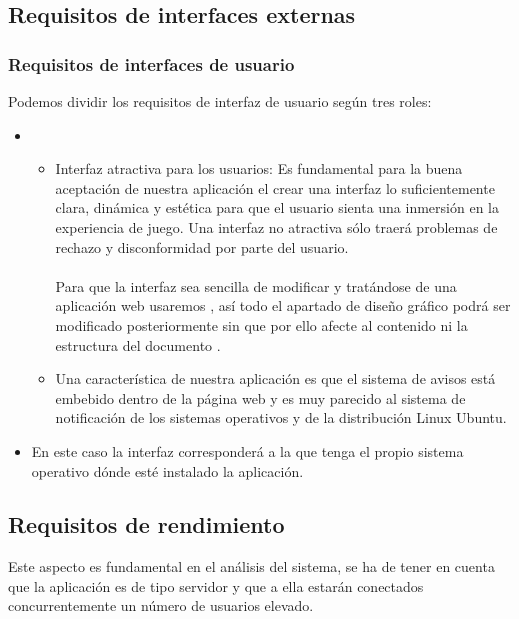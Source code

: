 \subsection{Requisitos de interfaces externas}
\subsubsection{Requisitos de interfaces de usuario}
Podemos dividir los requisitos de interfaz de usuario según tres roles:

\begin{itemize}
\item {}
  \begin{itemize}
  \item Interfaz atractiva para los usuarios: Es fundamental para la buena
    aceptación de nuestra aplicación el crear una interfaz lo suficientemente
    clara, dinámica y estética para que el usuario sienta una inmersión en la
    experiencia de juego. Una interfaz no atractiva sólo traerá problemas de
    rechazo y disconformidad por parte del usuario.\\\\
    Para que la interfaz sea sencilla de modificar y tratándose de una
    aplicación web usaremos , así todo el apartado
    de diseño gráfico podrá ser modificado posteriormente sin que por ello
    afecte al contenido ni la estructura del documento .
  \item Una característica de nuestra aplicación es que el sistema de avisos
    está embebido dentro de la página web y es muy parecido al sistema de
    notificación de los sistemas operativos  y de la \cursiva
    {distribución Linux Ubuntu}.
  \end{itemize}
\item {} En este caso la interfaz corresponderá a la que
  tenga el propio sistema operativo dónde esté instalado la aplicación.
\end{itemize}

\subsection{Requisitos de rendimiento}
Este aspecto es fundamental en el análisis del sistema, se ha de tener en cuenta
que la aplicación es de tipo servidor y que a ella estarán
conectados concurrentemente un número de usuarios elevado.\\

